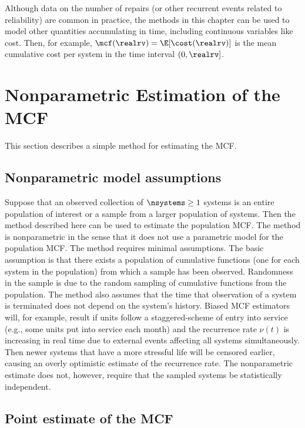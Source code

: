 Although data on the number of repairs (or other recurrent events
related to reliability) are common in practice, the methods in this
chapter can be used to model other quantities accumulating in time,
including continuous variables like cost.  Then, for example,
$\mcf(\realrv)=\E[\cost(\realrv)]$ is the mean cumulative cost per
system in the time interval $(0, \realrv]$.

\section{Nonparametric Estimation of the MCF}
\label{section:nonpar.mcf}
This section describes a simple method for estimating the MCF.

\subsection{Nonparametric model assumptions}
Suppose that an observed collection of $\nsystems \ge 1$ systems is
an entire population of interest or a sample from a larger
population of systems.  Then the method described here can be used
to estimate the population MCF. The method is nonparametric in the
sense that it does not use a parametric model for the population
MCF. The method requires minimal assumptions. The basic assumption
is that there exists a population of cumulative functions (one for
each system in the population) from which a sample has been
observed. Randomness in the sample is due to the random sampling of
cumulative functions from the population. The method also assumes
that the time that observation of a system is terminated does not
depend on the system's history. Biased MCF estimators will, for
example, result if units follow a staggered-scheme of entry into
service (e.g., some units put into service each month) and the
recurrence rate $\nu(t)$ is increasing in real time due to external
events affecting all systems simultaneously.  Then newer systems
that have a more stressful life will be censored earlier, causing an
overly optimistic estimate of the recurrence rate. The nonparametric
estimate does not, however, require that the sampled systems be
statistically independent.

\subsection{Point estimate of the MCF}

